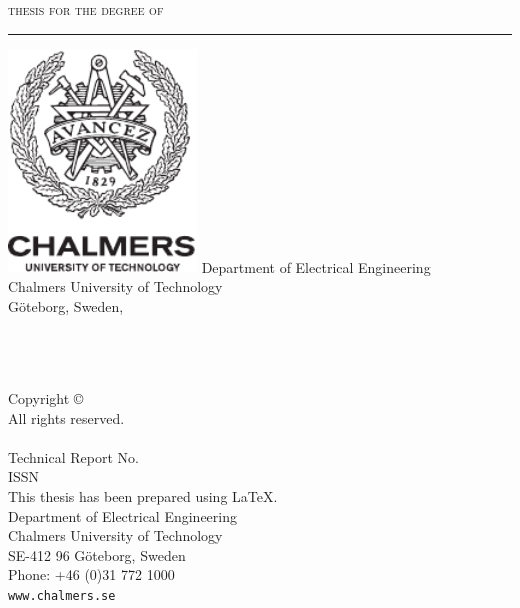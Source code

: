\begin{center}
\textsc{thesis for the degree of \TheThesisType}
\vspace{0.5cm}
\hrule
\vspace{3 cm}
{\Large {\TitlePageTitle}\par}
\vspace{1 cm}
{\large\textsc{\TitlePageName}\par} 
\vspace{2 cm}
\includegraphics[width=5cm]{TemplateFiles/logos/chalmers_logo_black}
\vfill
\vspace{0.5 cm}
Department of Electrical Engineering \\
Chalmers University of Technology \\
G\"{o}teborg, Sweden, \TheYear
\end{center}

\newpage

\thispagestyle{empty}

\textbf{\ISSNPageTitle}\\\\
{\textsc{\ISSNPageName}}
\vspace{4.0 cm}\\
Copyright \copyright~\TheYear~\textsc{\ISSNPageName}\\ All rights reserved.\\
\vspace{1.5 cm}\\
Technical Report No.~\TheReportNo \\ 
ISSN \TheISSN\\
\vspace{1 cm}%
This thesis has been prepared using \LaTeX.\\
Department of Electrical Engineering \\
Chalmers University of Technology \\
SE-412 96 Göteborg, Sweden \\
Phone: +46 (0)31 772 1000 \\
\texttt{www.chalmers.se} \\
\vfill
{}

